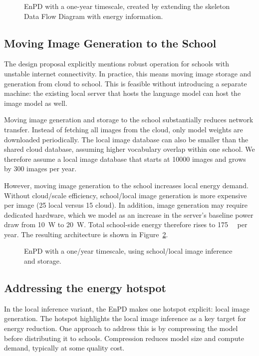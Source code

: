 \begin{figure}[ht]
  \centering
  \caption{EnPD with a one-year timescale, created by extending the skeleton Data Flow Diagram with energy information.}%
  \label{fig:epd}
\end{figure}

\subsection{Moving Image Generation to the School}
The design proposal explicitly mentions robust operation for schools with unstable internet connectivity.
In practice, this means moving image storage and generation from cloud to school.
This is feasible without introducing a separate machine: the existing local server that hosts the language model can host the image model as well.

Moving image generation and storage to the school substantially reduces network transfer.
Instead of fetching all images from the cloud, only model weights are downloaded periodically.
The local image database can also be smaller than the shared cloud database, assuming higher vocabulary overlap within one school.
We therefore assume a local image database that starts at \num{10000} images and grows by \num{300} images per year.

However, moving image generation to the school increases local energy demand.
Without cloud\-/scale efficiency, school\-/local image generation is more expensive per image (\qty{25}{\watthour} local versus \qty{15}{\watthour} cloud).
In addition, image generation may require dedicated hardware, which we model as an increase in the server's baseline power draw from \qty{10}{\watt} to \qty{20}{\watt}.
Total school-side energy therefore rises to \qty{175}{\kilo\watthour} per year.
The resulting architecture is shown in Figure~\ref{fig:epd-local}.

\begin{figure}[ht]
  \centering
  \caption{EnPD with a one\-/year timescale, using school\-/local image inference and storage.}%
  \label{fig:epd-local}
\end{figure}

\subsection{Addressing the energy hotspot}
In the local inference variant, the EnPD makes one hotspot explicit: local image generation.
The hotspot highlights the local image inference as a key target for energy reduction.
One approach to address this is by compressing the model before distributing it to schools.
Compression reduces model size and compute demand, typically at some quality cost.

